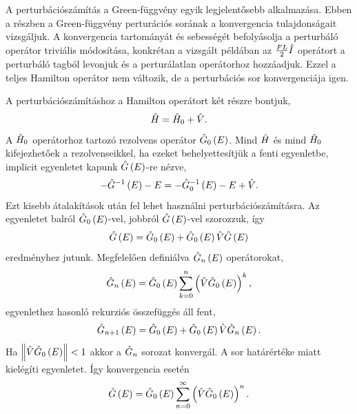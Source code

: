 A perturbációszámítás a Green-függvény egyik legjelentősebb alkalmazása. Ebben a részben a Green-függvény perturációs sorának a konvergencia tulajdonságait vizsgáljuk. A konvergencia tartományát és sebességét befolyásolja a perturbáló operátor triviális módosítása, konkrétan a vizsgált példában az $\frac{FL}{2}\hat{I}$ operátort a perturbáló tagból levonjuk és a perturálatlan operátorhoz hozzáadjuk. Ezzel a teljes Hamilton operátor nem változik, de a perturbációs sor konvergenciája igen.

A perturbációszámításhoz a Hamilton operátort két részre bontjuk,
\begin{equation}
	\hat{H} = \hat{H}_0 + \hat{V}.
\end{equation}
A $\hat{H}_0$ operátorhoz tartozó rezolvens operátor $\hat{G}_0\left(E\right)$. Mind $\hat{H}$ és mind $\hat{H}_0$ kifejezhetőek a rezolvenseikkel, ha ezeket behelyettesítjük a fenti egyenletbe, implicit egyenletet kapunk $\hat{G}\left(E\right)$-re nézve,
\begin{equation}
	-\hat{G}^{-1}\left(E\right) - E = -\hat{G}_0^{-1}\left(E\right) - E + \hat{V}.
\end{equation}
Ezt kisebb átalakítások után fel lehet használni perturbációszámításra. Az egyenletet balról $\hat{G}_0\left(E\right)$-vel, jobbról $\hat{G}\left(E\right)$-vel szorozzuk, így
\begin{equation}
	\hat{G}\left(E\right) = \hat{G}_0\left(E\right) + \hat{G}_0\left(E\right)\hat{V}\hat{G}\left(E\right)
	\label{green:pertmaster}
\end{equation}
eredményhez jutunk. Megfelelően definiálva $\hat{G}_n\left(E\right)$ operátorokat,
\begin{equation}
	\hat{G}_n\left(E\right) = \hat{G}_0\left(E\right)\sum_{k=0}^n\left(\hat{V}\hat{G}_0\left(E\right)\right)^k,
\end{equation}
 egyenlethez hasonló rekurziós összefüggés áll fent,
\begin{equation}
	\hat{G}_{n+1}\left(E\right) = \hat{G}_0\left(E\right) + \hat{G}_0\left(E\right)\hat{V}\hat{G}_n\left(E\right).
	\label{perturbation:rekurzió}
\end{equation}
Ha $\left\lVert \hat{V}\hat{G}_0\left(E\right) \right\rVert < 1$ akkor a $\hat{G}_n$ sorozat konvergál. A sor határértéke  miatt kielégíti  egyenletet. Így konvergencia esetén
\begin{equation}
	\hat{G}\left(E\right) = \hat{G}_0\left(E\right)\sum_{n=0}^\infty\left(\hat{V}\hat{G}_0\left(E\right)\right)^n.
\end{equation}


